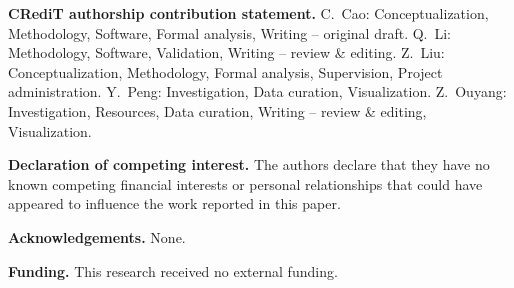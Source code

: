 \documentclass[11pt]{article}
\theoremstyle{dshplain}
\theoremstyle{dshdefn}
\begin{document}
\noindent\textbf{CRediT authorship contribution statement.}
C.~Cao: Conceptualization, Methodology, Software, Formal analysis,
Writing -- original draft. Q.~Li: Methodology, Software, Validation,
Writing -- review \& editing. Z.~Liu: Conceptualization, Methodology,
Formal analysis, Supervision, Project administration.
Y.~Peng: Investigation, Data curation, Visualization.
Z.~Ouyang: Investigation, Resources, Data curation, Writing -- review \& editing,
Visualization.

\noindent\textbf{Declaration of competing interest.}
The authors declare that they have no known competing financial interests or
personal relationships that could have appeared to influence the work reported in
this paper.

\noindent\textbf{Acknowledgements.}
None.

\noindent\textbf{Funding.}
This research received no external funding.



\end{document}
